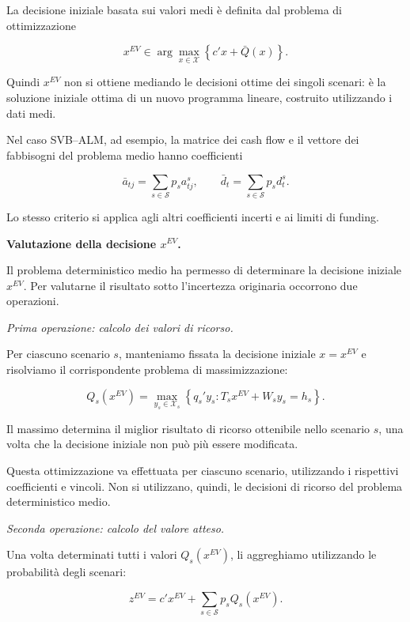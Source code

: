 La decisione iniziale basata sui valori medi
\`e definita dal problema di ottimizzazione

\begin{equation}
\boxed{
x^{EV}
\in
\arg\max_{x\in\mathcal X}
\left\{
c'x+\bar Q(x)
\right\}.
}
\label{eq:cap15-decisione-ev-v2}
\end{equation}

Quindi $x^{EV}$ non si ottiene mediando
le decisioni ottime dei singoli scenari:
\`e la soluzione iniziale ottima
di un nuovo programma lineare,
costruito utilizzando i dati medi.

Nel caso SVB--ALM, ad esempio,
la matrice dei cash flow e il vettore
dei fabbisogni del problema medio
hanno coefficienti

\[
\bar a_{tj}
=
\sum_{s\in\mathcal S}p_s a_{tj}^s,
\qquad
\bar d_t
=
\sum_{s\in\mathcal S}p_s d_t^s.
\]

Lo stesso criterio si applica agli altri
coefficienti incerti e ai limiti di funding.

\medskip

\noindent
\textbf{Valutazione della decisione $x^{EV}$.}

Il problema deterministico medio ha permesso
di determinare la decisione iniziale $x^{EV}$.
Per valutarne il risultato sotto l'incertezza
originaria occorrono due operazioni.

\textit{Prima operazione: calcolo dei valori di ricorso.}

Per ciascuno scenario $s$, manteniamo fissata
la decisione iniziale $x=x^{EV}$ e risolviamo
il corrispondente problema di massimizzazione:

\[
Q_s(x^{EV})
=
\max_{y_s\in\mathcal X_s}
\left\{
q_s'y_s:
T_sx^{EV}+W_sy_s=h_s
\right\}.
\]

Il massimo determina il miglior risultato
di ricorso ottenibile nello scenario $s$,
una volta che la decisione iniziale
non pu\`o pi\`u essere modificata.

Questa ottimizzazione va effettuata
per ciascuno scenario, utilizzando
i rispettivi coefficienti e vincoli.
Non si utilizzano, quindi, le decisioni
di ricorso del problema deterministico medio.

\textit{Seconda operazione: calcolo del valore atteso.}

Una volta determinati tutti i valori
$Q_s(x^{EV})$, li aggreghiamo utilizzando
le probabilit\`a degli scenari:

\begin{equation}
\boxed{
z^{EV}
=
c'x^{EV}
+
\sum_{s\in\mathcal S}p_sQ_s(x^{EV}).
}
\label{eq:cap15-ev-benchmark-v2}
\end{equation}

